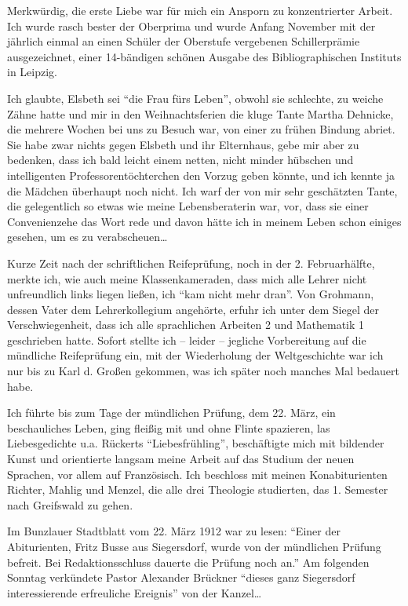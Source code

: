 \documentclass[a5paper,pagesize,10pt,twoside=true]{scrbook}
\renewcommand{\marginpar}[2][]{}
\begin{document}
Merkwürdig, die erste Liebe war für mich ein Ansporn zu konzentrierter Arbeit. Ich wurde rasch bester der Oberprima und wurde Anfang November mit der jährlich einmal an einen Schüler der Oberstufe vergebenen Schillerprämie ausgezeichnet, einer 14-bändigen schönen Ausgabe des Bibliographischen Instituts in Leipzig.

Ich glaubte, Elsbeth sei \enquote{die Frau fürs Leben}, obwohl sie schlechte, zu weiche Zähne hatte und mir in den Weihnachtsferien die kluge Tante Martha Dehnicke, die mehrere Wochen bei uns zu Besuch war, von einer zu frühen Bindung abriet. Sie habe zwar nichts gegen Elsbeth und ihr Elternhaus, gebe mir aber zu bedenken, dass ich bald leicht einem netten, nicht minder hübschen und intelligenten Professorentöchterchen den Vorzug geben könnte, und ich kennte ja die Mädchen überhaupt noch nicht. Ich warf der von mir sehr geschätzten Tante, die gelegentlich so etwas wie meine Lebensberaterin war, vor, dass sie einer Convenienzehe das Wort rede und davon hätte ich in meinem Leben schon einiges gesehen, um es zu verabscheuen\dots

\marginpar{79}
Kurze Zeit nach der schriftlichen Reifeprüfung, noch in der 2. Februarhälfte, merkte ich, wie auch meine Klassenkameraden, dass mich alle Lehrer nicht unfreundlich links liegen ließen, ich \enquote{kam nicht mehr dran}. Von Grohmann, dessen Vater dem Lehrerkollegium angehörte, erfuhr ich unter dem Siegel der Verschwiegenheit, dass ich alle sprachlichen Arbeiten 2 und Mathematik 1 geschrieben hatte. Sofort stellte ich -- leider -- jegliche Vorbereitung auf die mündliche Reifeprüfung ein, mit der Wiederholung der Weltgeschichte war ich nur bis zu Karl d. Großen gekommen, was ich später noch manches Mal bedauert habe.

Ich führte bis zum Tage der mündlichen Prüfung, dem 22. März, ein beschauliches Leben, ging fleißig mit und ohne Flinte spazieren, las Liebesgedichte u.a. Rückerts \enquote{Liebesfrühling}, beschäftigte mich mit bildender Kunst und orientierte langsam meine Arbeit auf das Studium der neuen Sprachen, vor allem auf Französisch. Ich beschloss mit meinen Konabiturienten Richter, Mahlig und Menzel, die alle drei Theologie studierten, das 1. Semester nach Greifswald zu gehen.

Im Bunzlauer Stadtblatt vom 22. März 1912 war zu lesen: \enquote{Einer der Abiturienten, Fritz Busse aus Siegersdorf, wurde von der mündlichen Prüfung befreit. Bei Redaktionsschluss dauerte die Prüfung noch an.} Am folgenden Sonntag verkündete Pastor Alexander Brückner \enquote{dieses ganz Siegersdorf interessierende erfreuliche Ereignis} von der Kanzel\dots
\end{document}
